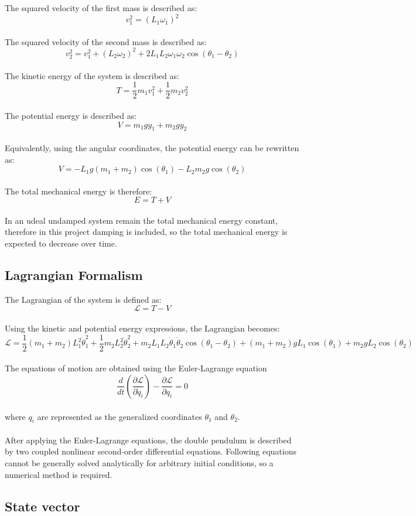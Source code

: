 \documentclass[12pt,a4paper]{article}
\begin{document}
The squared velocity of the first mass is described as:
\[v_1^2 = (L_1 \omega_1)^2\]\\
The squared velocity of the second mass is described as:
\[v_2^2 =v_1^2+(L_2 \omega_2)^2+2 L_1 L_2 \omega_1 \omega_2 \cos(\theta_1 - \theta_2)\]\\
The kinetic energy of the system is described as:
\[T =
\frac{1}{2}m_1v_1^2+\frac{1}{2}m_2v_2^2\]\\
The potential energy is described as:
\[V = m_1 g y_1 + m_2 g y_2\]\\
Equivalently, using the angular coordinates, the potential energy can be rewritten as:
\[V = -L_1g (m_1 + m_2)\cos(\theta_1)-L_2m_2g\cos(\theta_2)\]\\
The total mechanical energy is therefore:
\[E = T + V\]\\
In an udeal undamped system remain the total mechanical energy constant, therefore in this project damping is included, so the total mechanical energy is expected to decrease over time.

\subsection{Lagrangian Formalism}

The Lagrangian of the system is defined as:
\[\mathcal{L} = T - V\]\\
Using the kinetic and potential energy expressions, the Lagrangian becomes:
\[\mathcal{L}=\frac{1}{2}(m_1+m_2)L_1^2\dot{\theta}_1^2+\frac{1}{2}m_2L_2^2\dot{\theta}_2^2+m_2L_1L_2\dot{\theta}_1\dot{\theta}_2\cos(\theta_1-\theta_2)+(m_1+m_2)gL_1\cos(\theta_1)+m_2gL_2\cos(\theta_2)\]\\
The equations of motion are obtained using the Euler-Lagrange equation
\[\frac{d}{dt}\left(\frac{\partial \mathcal{L}}{\partial \dot{q}_i}\right)-\frac{\partial \mathcal{L}}{\partial q_i}= 0\]\\
where $q_i$ are represented as the generalized coordinates $\theta_1$ and $\theta_2$.
\\\\
After applying the Euler-Lagrange equations, the double pendulum is described by two coupled nonlinear second-order differential equations. Following equations cannot be generally solved analytically for arbitrary initial conditions, so a numerical method is required.

\subsection{State vector}
\end{document}
